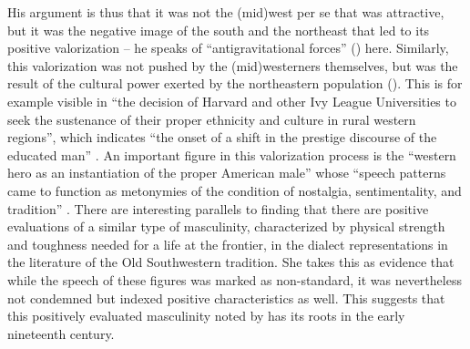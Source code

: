 His argument is thus that it was not the (mid)west per se that was attractive, but it was the negative image of the south and the northeast that led to its positive valorization – he speaks of “antigravitational forces” (\citeyear[72]{Bonfiglio2002}) here. Similarly, this valorization was not pushed by the (mid)westerners themselves, but was the result of the cultural power exerted by the northeastern population (\citeyear[72]{Bonfiglio2002}). This is for example visible in “the decision of Harvard and other Ivy League Universities to seek the sustenance of their proper ethnicity and culture in rural western regions”, which indicates “the onset of a shift in the prestige discourse of the educated man” \citep[230]{Bonfiglio2002}. An important figure in this valorization process is the “western hero as an instantiation of the proper American male” whose “speech patterns came to function as metonymies of the condition of nostalgia, sentimentality, and tradition” \citep[231]{Bonfiglio2002}. There are interesting parallels to  finding that there are positive evaluations of a similar type of masculinity, characterized by physical strength and toughness needed for a life at the frontier, in the dialect representations in the literature of the Old Southwestern tradition. She takes this as evidence that while the speech of these figures was marked as non-standard, it was nevertheless not condemned but indexed positive characteristics as well. This suggests that this positively evaluated masculinity noted by \citet{Bonfiglio2002} has its roots in the early nineteenth century.

